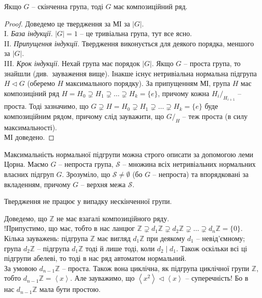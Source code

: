 \documentclass{math_library}
\begin{document}
\begin{proposition}
Якщо $G$ -- скінченна група, тоді $G$ має композиційний ряд.
\end{proposition}

\begin{proof}
Доведемо це твердження за МІ за $|G|$.\\
I. \textit{База індукції}. $|G| = 1$ -- це тривіальна група, тут все ясно.\\
II. \textit{Припущення індукції}. Твердження виконується для деякого порядка, меншого за $|G|$.\\
III. \textit{Крок індукції}. Нехай група має порядок $|G|$. Якщо $G$ -- проста група, то знайшли (див.\ зауваження вище). Інакше існує нетривіальна нормальна підгрупа $H \triangleleft G$ (оберемо $H$ максимального порядку). За припущенням МІ, група $H$ має композиціний ряд $H = H_0 \supsetneq H_1 \supsetneq \dots \supsetneq H_k = \{e\}$, причому кожна ${H_i}/_{H_{i+1}}$ -- проста. Тоді зазначимо, що $G \supsetneq H = H_0 \supsetneq  H_1 \supsetneq \dots \supsetneq H_k = \{e\}$ буде композиційним рядом, причому слід зауважити, що $G/_H$ -- теж проста (в силу максимальності).\\
МІ доведено.
\end{proof}

\begin{remark}
Максимальність нормальної підгрупи можна строго описати за допомогою леми Цорна. Маємо $G$ -- непроста група, $\mathcal{S}$ -- множина всіх нетривіальних нормальних власних підгруп $G$. Зрозуміло, що $\mathcal{S} \neq \emptyset$ (бо $G$ -- непроста) та впорядковані за вкладенням, причому $G$ -- верхня межа $\mathcal{S}$.  
\end{remark}

\begin{remark}
Твердження не працює у випадку нескінченної групи.
\end{remark}

\begin{example}
Доведемо, що $\mathbb{Z}$ не має взагалі композиційного ряду.\\
!Припустимо, що має, тобто в нас ланцюг $\mathbb{Z} \supsetneq d_1 \mathbb{Z} \supsetneq d_2 \mathbb{Z} \supsetneq \dots \supsetneq d_n \mathbb{Z} = \{0\}$. Кілька зауважень: підгрупа $\mathbb{Z}$ має вигляд $d_1 \mathbb{Z}$ при деякому $d_1$ -- невід'ємному; група $d_2 \mathbb{Z}$ -- підгрупа $d_1 \mathbb{Z}$ тоді й лише тоді, коли $d_2 \mid d_1$. Також оскільки всі ці підгрупи абелеві, то тоді в нас ряд автоматом нормальний.\\
За умовою $d_{n-1} \mathbb{Z}$ -- проста. Також вона циклічна, як підгрупа циклічної групи $\mathbb{Z}$, тобто $d_{n-1} \mathbb{Z} = \left<x\right>$. Але зауважимо, що $\left<x^2 \right> \triangleleft \left<x\right>$ -- суперечність! Бо в нас $d_{n-1} \mathbb{Z}$ мала бути простою.
\end{example}
\end{document}
